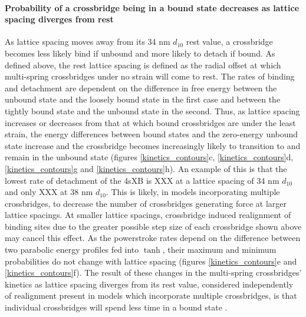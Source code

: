 \documentclass[]{article}
\begin{document}
\paragraph{Probability of a crossbridge being in a bound state decreases as lattice spacing diverges from rest} %
As lattice spacing moves away from its 34 nm $d_{10}$ rest value, a crossbridge becomes less likely bind if unbound and more likely to detach if bound.
As defined above, the rest lattice spacing is defined as the radial offset at which multi-spring crossbridges under no strain will come to rest.
The rates of binding and detachment are dependent on the difference in free energy between the unbound state and the loosely bound state in the first case and between the tightly bound state and the unbound state in the second.
Thus, as lattice spacing increases or decreases from that at which bound crossbridges are under the least strain, the energy differences between bound states and the zero-energy unbound state increase and the crossbridge becomes increasingly likely to transition to and remain in the unbound state (figures \ref{kinetics_contours}c, \ref{kinetics_contours}d, \ref{kinetics_contours}g and \ref{kinetics_contours}h). 
An example of this is that the lowest rate of detachment of the 4sXB is XXX at a lattice spacing of 34 nm $d_{10}$ and only XXX at 38 nm $d_{10}$.
This is likely, in models incorporating multiple crossbridges, to decrease the number of crossbridges generating force at larger lattice spacings. 
At smaller lattice spacings, crossbridge induced realignment of binding sites due to the greater possible step size of each crossbridge shown above may cancel this effect.
As the powerstroke rates depend on the difference between two parabolic energy profiles fed into $\tanh$, their maximum and minimum probabilities do not change with lattice spacing (figures \ref{kinetics_contours}e and \ref{kinetics_contours}f). 
The result of these changes in the multi-spring crossbridges' kinetics as lattice spacing diverges from its rest value, considered independently of realignment present in models which incorporate multiple crossbridges, is that individual crossbridges will spend less time in a bound state . 
\end{document}
